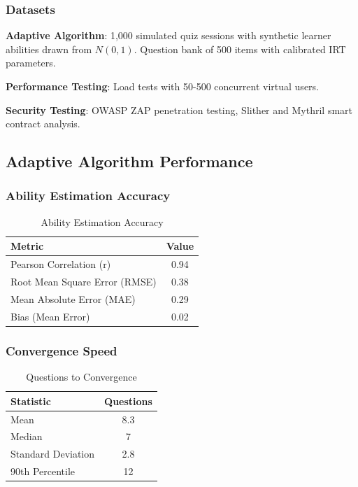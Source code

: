 \documentclass[conference]{IEEEtran}
\begin{document}
\subsubsection{Datasets}

\textbf{Adaptive Algorithm}: 1,000 simulated quiz sessions with synthetic learner abilities drawn from $N(0, 1)$. Question bank of 500 items with calibrated IRT parameters.

\textbf{Performance Testing}: Load tests with 50-500 concurrent virtual users.

\textbf{Security Testing}: OWASP ZAP penetration testing, Slither and Mythril smart contract analysis.

\subsection{Adaptive Algorithm Performance}

\subsubsection{Ability Estimation Accuracy}

\begin{table}[htbp]
\caption{Ability Estimation Accuracy}
\begin{center}
\begin{tabular}{|l|c|}
\hline
\textbf{Metric} & \textbf{Value} \\
\hline
Pearson Correlation (r) & 0.94 \\
\hline
Root Mean Square Error (RMSE) & 0.38 \\
\hline
Mean Absolute Error (MAE) & 0.29 \\
\hline
Bias (Mean Error) & 0.02 \\
\hline
\end{tabular}
\label{tab:accuracy}
\end{center}
\end{table}

\subsubsection{Convergence Speed}

\begin{table}[htbp]
\caption{Questions to Convergence}
\begin{center}
\begin{tabular}{|l|c|}
\hline
\textbf{Statistic} & \textbf{Questions} \\
\hline
Mean & 8.3 \\
\hline
Median & 7 \\
\hline
Standard Deviation & 2.8 \\
\hline
90th Percentile & 12 \\
\hline
\end{tabular}
\label{tab:convergence}
\end{center}
\end{table}
\end{document}
